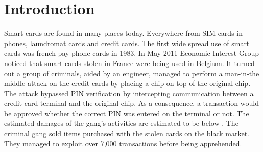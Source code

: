 \chapter{Introduction}
Smart cards are found in many places today. Everywhere from SIM cards in phones, laundromat cards and credit cards. The first wide spread use of smart cards was french pay phone cards in 1983\cite[p. 366]{modbank}. In May 2011 Economic Interest Group noticed that smart cards stolen in France were being used in Belgium. It turned out a group of criminals, aided by an engineer, managed to perform a man-in-the middle attack on the credit cards by placing a chip on top of the original chip. The attack bypassed PIN verification by intercepting communication between a credit card terminal and the original chip. As a consequence, a transaction would be approved whether the correct PIN was entered on the terminal or not. The estimated damages of the gang's activities are estimated to be below . The criminal gang sold items purchased with the stolen cards on the black market. They managed to exploit over 7,000 transactions before being apprehended.